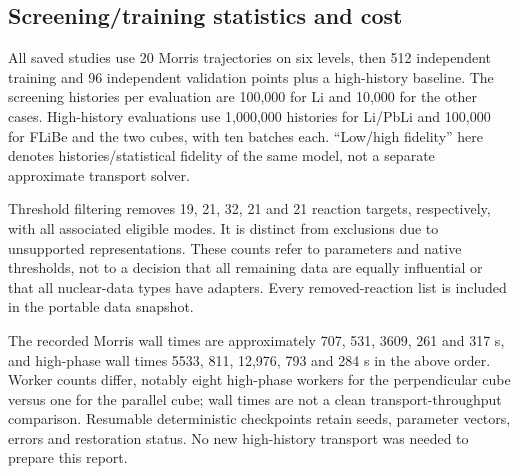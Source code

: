 \subsection{Screening/training statistics and cost}
All saved studies use 20 Morris trajectories on six levels, then 512 independent training and 96 independent validation points plus a high-history baseline. The screening histories per evaluation are 100,000 for Li and 10,000 for the other cases. High-history evaluations use 1,000,000 histories for Li/PbLi and 100,000 for FLiBe and the two cubes, with ten batches each. ``Low/high fidelity'' here denotes histories/statistical fidelity of the same model, not a separate approximate transport solver.

\begin{table}[tbp]\centering\small
\caption{Saved executed cost and screening outcome. Counts include small baseline/diagnostic overhead above $20(d+1)$. Histories are cumulative source histories, not collision counts.}
\end{table}

Threshold filtering removes 19, 21, 32, 21 and 21 reaction targets, respectively, with all associated eligible modes. It is distinct from exclusions due to unsupported representations. These counts refer to parameters and native thresholds, not to a decision that all remaining data are equally influential or that all nuclear-data types have adapters. Every removed-reaction list is included in the portable data snapshot.

The recorded Morris wall times are approximately 707, 531, 3609, 261 and 317 s, and high-phase wall times 5533, 811, 12,976, 793 and 284 s in the above order. Worker counts differ, notably eight high-phase workers for the perpendicular cube versus one for the parallel cube; wall times are not a clean transport-throughput comparison. Resumable deterministic checkpoints retain seeds, parameter vectors, errors and restoration status. No new high-history transport was needed to prepare this report.
